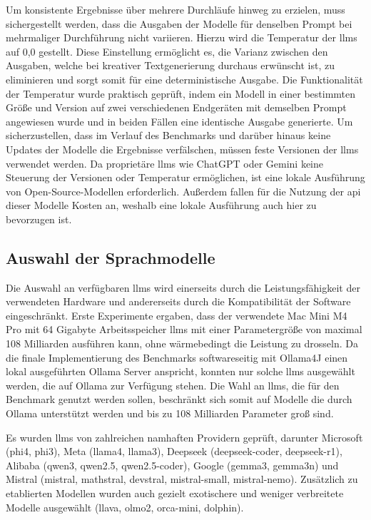 Um konsistente Ergebnisse über mehrere Durchläufe hinweg zu erzielen, muss sichergestellt werden, dass die Ausgaben der Modelle für denselben Prompt bei mehrmaliger Durchführung nicht variieren.
Hierzu wird die Temperatur der \glspl{llm} auf 0,0 gestellt.
Diese Einstellung ermöglicht es, die Varianz zwischen den Ausgaben, welche bei kreativer Textgenerierung durchaus erwünscht ist, zu eliminieren und sorgt somit für eine deterministische Ausgabe.
Die Funktionalität der Temperatur wurde praktisch geprüft, indem ein Modell in einer bestimmten Größe und Version auf zwei verschiedenen Endgeräten mit demselben Prompt angewiesen wurde und in beiden Fällen eine identische Ausgabe generierte.
Um sicherzustellen, dass im Verlauf des Benchmarks und darüber hinaus keine Updates der Modelle die Ergebnisse verfälschen, müssen feste Versionen der \glspl{llm} verwendet werden.
Da proprietäre \glspl{llm} wie ChatGPT oder Gemini keine Steuerung der Versionen oder Temperatur ermöglichen, ist eine lokale Ausführung von Open-Source-Modellen erforderlich.
Außerdem fallen für die Nutzung der \gls{api} dieser Modelle Kosten an, weshalb eine lokale Ausführung auch hier zu bevorzugen ist.


\subsection{Auswahl der Sprachmodelle}\label{sec:modelle-benchmark}

Die Auswahl an verfügbaren \glspl{llm} wird einerseits durch die Leistungsfähigkeit der verwendeten Hardware und andererseits durch die Kompatibilität der Software eingeschränkt.
Erste Experimente ergaben, dass der verwendete Mac Mini M4 Pro mit 64 Gigabyte Arbeitsspeicher \glspl{llm} mit einer Parametergröße von maximal 108 Milliarden ausführen kann, ohne wärmebedingt die Leistung zu drosseln.
Da die finale Implementierung des Benchmarks softwareseitig mit Ollama4J einen lokal ausgeführten Ollama Server anspricht, konnten nur solche \glspl{llm} ausgewählt werden, die auf Ollama zur Verfügung stehen.
Die Wahl an \glspl{llm}, die für den Benchmark genutzt werden sollen, beschränkt sich somit auf Modelle die durch Ollama unterstützt werden und bis zu 108 Milliarden Parameter groß sind.

Es wurden \glspl{llm} von zahlreichen namhaften Providern geprüft, darunter Microsoft (phi4, phi3), Meta (llama4, llama3), Deepseek (deepseek-coder, deepseek-r1), Alibaba (qwen3, qwen2.5, qwen2.5-coder), Google (gemma3, gemma3n) und Mistral (mistral, mathstral, devstral, mistral-small, mistral-nemo).
Zusätzlich zu etablierten Modellen wurden auch gezielt exotischere und weniger verbreitete Modelle ausgewählt (llava, olmo2, orca-mini, dolphin).


